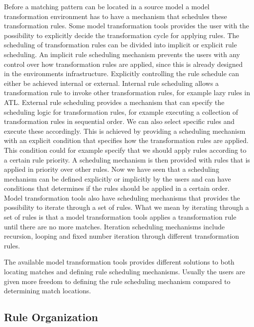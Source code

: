 Before a matching pattern can be located in a source model a model
transformation environment has to have a mechanism that schedules these
transformation rules. Some model transformation tools provides the user with the
possibility to explicitly decide the transformation cycle for applying rules.
The scheduling of transformation rules can be divided into implicit or explicit rule
scheduling. An implicit rule scheduling mechanism prevents the users with any
control over how transformation rules are applied, since this is already
designed in the environments infrastructure. Explicitly controlling the rule
schedule can either be achieved internal or external. Internal rule
scheduling allows a transformation rule to invoke other transformation rules, for example
lazy rules in ATL. External rule scheduling provides a mechanism that can
specify the scheduling logic for transformation rules, for example executing a
collection of transformation rules in sequential order. We can also select
specific rules and execute these accordingly. This is achieved by providing a
scheduling mechanism with an explicit condition that specifies how the
transformation rules are applied. This condition could for example specify that
we should apply rules according to a certain rule priority. A scheduling
mechanism is then provided with rules that is applied in priority over other
rules. Now we have seen that a scheduling mechanism can be defined explicitly
or implicitly by the users and can have conditions that determines if the rules
should be applied in a certain order. Model transformation tools also have
scheduling mechanisms that provides the possibility to iterate through a set of
rules. What we mean by iterating through a set of rules is that a model
transformation tools applies a transformation rule until there are no more
matches. Iteration scheduling mechanisms include recursion, looping and fixed
number iteration through different transformation rules.

The available model transformation tools provides different solutions to both
locating matches and defining rule scheduling mechanisms. Usually the users are
given more freedom to defining the rule scheduling mechanism compared to
determining match locations.

\subsection{Rule Organization}

